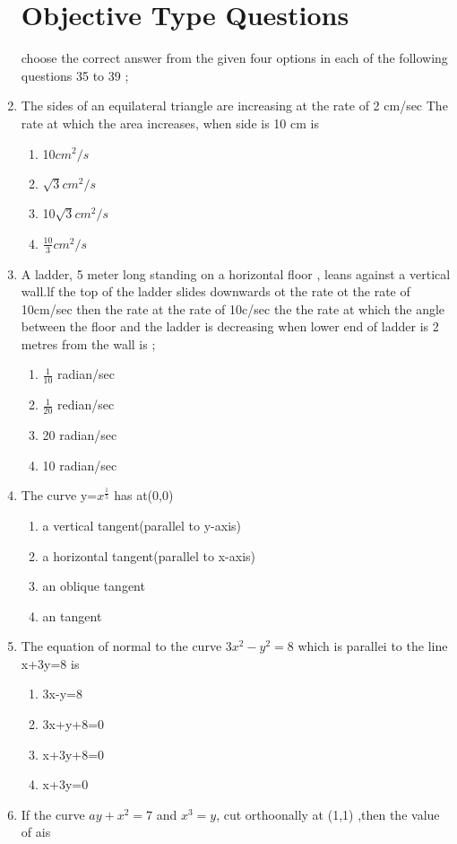 \documentclass[12pt]{article}
\begin{document}
\begin{enumerate}
	\section*{Objective Type Questions}
choose the correct answer from the given four options in each of the following questions 35 to 39 ;
\item The sides of an equilateral triangle are increasing at the rate of 2 cm/sec The rate at which the area increases, when side is 10 cm is
\begin{enumerate}
\item 10$cm^2/s$
\item $\sqrt{3}cm^2/s$
\item 10$\sqrt{3}cm^2/s$
\item $\frac{10}{3}cm^2/s$
\end{enumerate}
\item A ladder, 5 meter long standing on a horizontal floor , leans against a vertical wall.lf the top of the ladder slides downwards ot the rate ot the rate of 10cm/sec then the rate at the rate of 10c/sec the the rate at which the angle between the floor and the ladder is decreasing when lower end of ladder is 2 metres from the wall is  ;
\begin{enumerate}
\item $\frac{1}{10}$ radian/sec
\item $\frac{1}{20}$ redian/sec
\item 20 radian/sec
\item 10 radian/sec
\end{enumerate}
\item The curve y=$x^\frac{1}{5}$ has at(0,0)
\begin{enumerate}
\item a vertical tangent(parallel to y-axis)
\item a horizontal tangent(parallel to x-axis)
\item an oblique tangent
\item an  tangent
\end{enumerate}
 \item The equation of normal to the curve $3x^2-y^2 =8$ which is parallei to the line x+3y=8 is
 \begin{enumerate}
 \item 3x-y=8
 \item 3x+y+8=0
 \item x+3y+8=0
 \item x+3y=0
 \end{enumerate}
 \item If the curve $ay+x^2=7$ and $x^3=y$, cut orthoonally at (1,1) ,then the value of ais

\end{enumerate}
\end{document}
